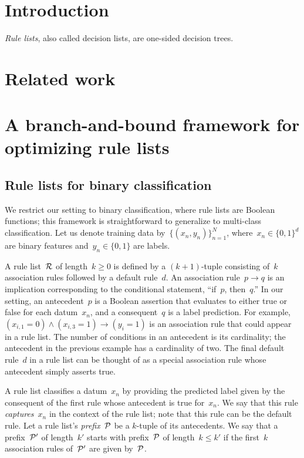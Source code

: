 \section{Introduction}

\emph{Rule lists}, also called decision lists, are one-sided decision trees.

\section{Related work}

\citep{rivest:1987}

\citep{LethamRuMcMa15}

\citep{YangRuSe16}

\section{A branch-and-bound framework for optimizing rule lists}

\subsection{Rule lists for binary classification}

We restrict our setting to binary classification,
where rule lists are Boolean functions;
this framework is straightforward to generalize to multi-class classification.
%
Let us denote training data by~${\{(x_n, y_n)\}_{n=1}^N}$,
where~${x_n \in \{0, 1\}^d}$ are binary features and~${y_n \in \{0, 1\}}$ are labels.

A rule list~${\mathcal R}$ of length~$k \ge 0$ is defined by a $(k+1)$-tuple consisting of~$k$
association rules followed by a default rule~$d$.
%
An association rule~${p \rightarrow q}$ is an implication corresponding to the
conditional statement, ``if~$p$, then~$q$.''
%
In our setting, an antecedent~$p$ is a Boolean assertion that evaluates to either
true or false for each datum~$x_n$, and a consequent~$q$ is a label prediction.
%
For example,~${(x_{i, 1} = 0) \wedge (x_{i, 3} = 1) \rightarrow (y_i = 1)}$
is an association rule that could appear in a rule list.
%
The number of conditions in an antecedent is its cardinality;
the antecedent in the previous example has a cardinality of two.
%
The final default rule~$d$ in a rule list can be thought of as a special
association rule whose antecedent simply asserts true.

A rule list classifies a datum~$x_n$ by providing the predicted label given
by the consequent of the first rule whose antecedent is true for~$x_n$.
%
We say that this rule \emph{captures}~$x_n$ in the context of the rule list;
note that this rule can be the default rule.
%
Let a rule list's \emph{prefix}~${\mathcal P}$ be a $k$-tuple of its antecedents.
%
We say that a prefix~${\mathcal P}'$ of length~$k'$ starts with prefix~${\mathcal P}$ of
length~$k \le k'$ if the first~$k$ association rules of~${\mathcal P}'$ are given by~${\mathcal P}$.

